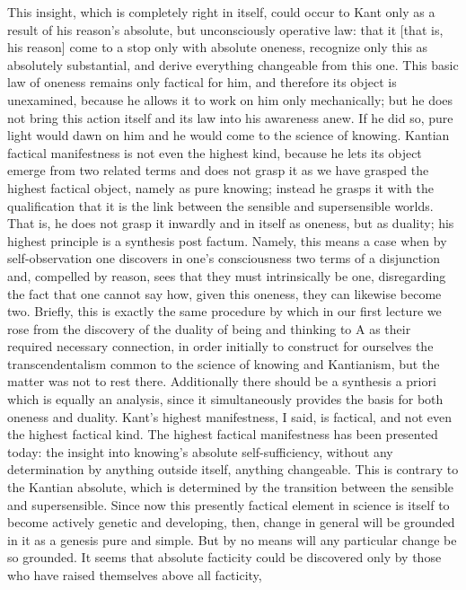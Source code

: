 This insight, which is completely right in itself,
could occur to Kant only as a result of his reason's absolute,
but unconsciously operative law: that it [that is, his reason]
come to a stop only with absolute oneness,
recognize only this as absolutely substantial,
and derive everything changeable from this one.
This basic law of oneness remains only factical for him,
and therefore its object is unexamined, because he allows it
to work on him only mechanically; but he does not bring
this action itself and its law into his awareness anew.
If he did so, pure light would dawn on him and he would
come to the science of knowing.
Kantian factical manifestness is not even the highest kind,
because he lets its object emerge from two related terms and
does not grasp it as we have grasped the highest factical object,
namely as pure knowing;
instead he grasps it with the qualification that
it is the link between the sensible and supersensible worlds.
That is, he does not grasp it inwardly
and in itself as oneness, but as duality;
his highest principle is a synthesis post factum.
Namely, this means a case when by self-observation one discovers
in one's consciousness two terms of a disjunction and,
compelled by reason, sees that they must intrinsically be one,
disregarding the fact that one cannot say how, given this oneness,
they can likewise become two.
Briefly, this is exactly the same procedure by which in our first lecture
we rose from the discovery of the duality of being and thinking to A
as their required necessary connection, in order initially to construct
for ourselves the transcendentalism common to the science of knowing
and Kantianism, but the matter was not to rest there.
Additionally there should be a synthesis a priori
which is equally an analysis,
since it simultaneously provides
the basis for both oneness and duality.
Kant's highest manifestness, I said, is factical,
and not even the highest factical kind.
The highest factical manifestness has been presented today:
the insight into knowing's absolute self-sufficiency,
without any determination by anything outside itself,
anything changeable.
This is contrary to the Kantian absolute,
which is determined by the transition
between the sensible and supersensible.
Since now this presently factical element in science
is itself to become actively genetic and developing,
then, change in general will be grounded in it
as a genesis pure and simple.
But by no means will any particular change be so grounded.
It seems that absolute facticity could be discovered only
by those who have raised themselves above all facticity,
